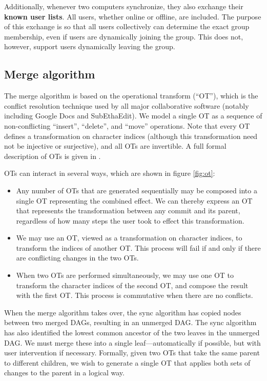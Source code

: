 \documentclass[11pt,titlepage]{article}
\begin{document}
Additionally, whenever two computers synchronize, they also exchange their \textbf{known user lists}. All users, whether online or offline, are included. The purpose of this exchange is so that all users collectively can determine the exact group membership, even if users are dynamically joining the group. This does not, however, support users dynamically leaving the group.

\subsection{Merge algorithm}

The merge algorithm is based on the operational transform (``OT''),
which is the conflict resolution technique used by all major
collaborative software (notably including Google Docs and
SubEthaEdit).  We model a single OT as a sequence of non-conflicting
``insert'', ``delete'', and ``move'' operations.  Note that every OT
defines a transformation on character indices (although this
transformation need not be injective or surjective), and all OTs are
invertible.  A full formal description of OTs is given in \cite{wave}.

OTs can interact in several ways, which are shown in figure \ref{fig:ot}:
\begin{itemize}
\item Any number of OTs that are generated sequentially may be
  composed into a single OT representing the combined effect.  We can
  thereby express an OT that represents the transformation between any
  commit and its parent, regardless of how many steps the user took to
  effect this transformation.
\item We may use an OT, viewed as a transformation on character
  indices, to transform the indices of another OT.  This process will
  fail if and only if there are conflicting changes in the two OTs.
\item When two OTs are performed simultaneously, we may use one OT to
  transform the character indices of the second OT, and compose the
  result with the first OT.  This process is commutative when there
  are no conflicts.
\end{itemize}

When the merge algorithm takes over, the sync algorithm has copied
nodes between two merged DAGs, resulting in an unmerged DAG.  The sync
algorithm has also identified the lowest common ancestor of the two
leaves in the unmerged DAG.  We must merge these into a single
leaf---automatically if possible, but with user intervention if
necessary. Formally, given two OTs that take the same parent to
different children, we wish to generate a single OT that applies both
sets of changes to the parent in a logical way.
\end{document}
